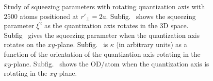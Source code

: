 \documentclass[preprint,aps,pra,onecolumn]{revtex4-1} %
\begin{document}
\begin{figure}
\begin{minipage}{.49\linewidth}
\end{minipage}
\begin{minipage}{.49\linewidth}
\centering
{}
\end{minipage}
\caption{Study of squeezing parameters with rotating quantization axis with $2500$ atoms positioned at $ r'\!_\perp=2a $. Subfig.~\protect{} shows the squeezing parameter $ \xi^2 $ as the quantization axis rotates in the 3D space. Subfig~\protect{} gives the squeezing parameter when the quantization axis rotates on the $ xy $-plane. Subfig.~\protect{} is $ \kappa $ (in arbitrary units) as a function of the orientation of the quantization axis rotating in the $ xy $-plane. Subfig.~\protect{} shows the $ \mathrm{OD}/{\mathrm{atom}} $ when the quantization axis is rotating in the $ xy $-plane.  }\label{fig:squeezing_q_D1_NA2500_r2a}
\end{figure}
\end{document}
